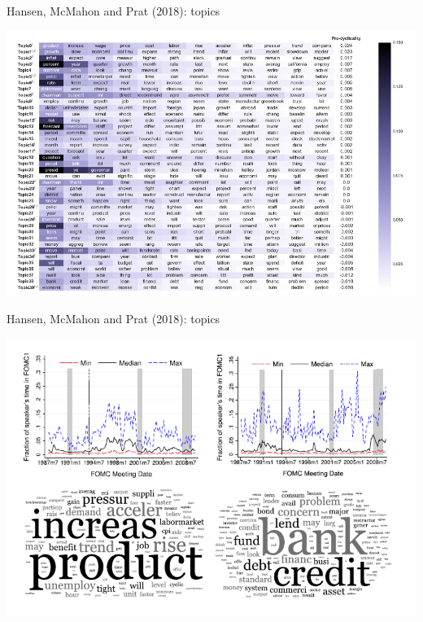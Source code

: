 \documentclass[english]{beamer}
\begin{document}
\begin{frame}{\small{Hansen, McMahon and Prat (2018): topics}}
\vspace{-7pt}
\begin{center}
\includegraphics[scale=0.4]{Images/hansen2018a.png}
\end{center}
\end{frame}

\begin{frame}{\small{Hansen, McMahon and Prat (2018): topics}}
\vspace{-7pt}
\begin{center}
\includegraphics[scale=0.5]{Images/hansen2018b.png}
\end{center}
\end{frame}
\end{document}
